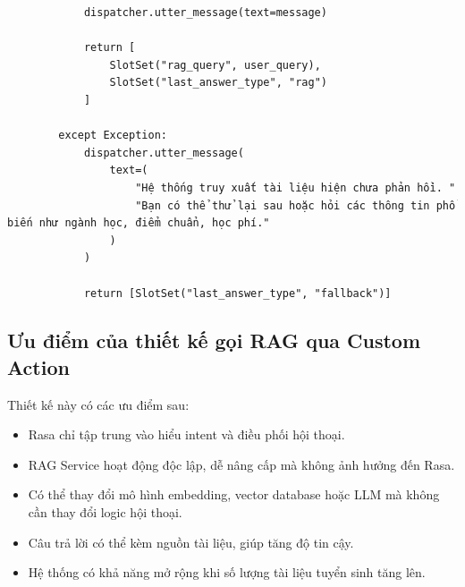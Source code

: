 \begin{verbatim}
            dispatcher.utter_message(text=message)

            return [
                SlotSet("rag_query", user_query),
                SlotSet("last_answer_type", "rag")
            ]

        except Exception:
            dispatcher.utter_message(
                text=(
                    "Hệ thống truy xuất tài liệu hiện chưa phản hồi. "
                    "Bạn có thể thử lại sau hoặc hỏi các thông tin phổ biến như ngành học, điểm chuẩn, học phí."
                )
            )

            return [SlotSet("last_answer_type", "fallback")]
\end{verbatim}

\subsection*{Ưu điểm của thiết kế gọi RAG qua Custom Action}

Thiết kế này có các ưu điểm sau:
\begin{itemize}
    \item Rasa chỉ tập trung vào hiểu intent và điều phối hội thoại.
    \item RAG Service hoạt động độc lập, dễ nâng cấp mà không ảnh hưởng đến Rasa.
    \item Có thể thay đổi mô hình embedding, vector database hoặc LLM mà không cần thay đổi logic hội thoại.
    \item Câu trả lời có thể kèm nguồn tài liệu, giúp tăng độ tin cậy.
    \item Hệ thống có khả năng mở rộng khi số lượng tài liệu tuyển sinh tăng lên.
\end{itemize}
